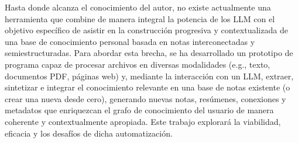 Hasta donde alcanza el conocimiento del autor, no existe actualmente una herramienta que combine de manera integral la potencia de los LLM con el objetivo específico de asistir en la construcción progresiva y contextualizada de una base de conocimiento personal basada en notas interconectadas y semiestructuradas. Para abordar esta brecha, se ha desarrollado un prototipo de programa capaz de procesar archivos en diversas modalidades (e.g., texto, documentos PDF, páginas web) y, mediante la interacción con un LLM, extraer, sintetizar e integrar el conocimiento relevante en una base de notas existente (o crear una nueva desde cero), generando nuevas notas, resúmenes, conexiones y metadatos que enriquezcan el grafo de conocimiento del usuario de manera coherente y contextualmente apropiada. Este trabajo explorará la viabilidad, eficacia y los desafíos de dicha automatización.